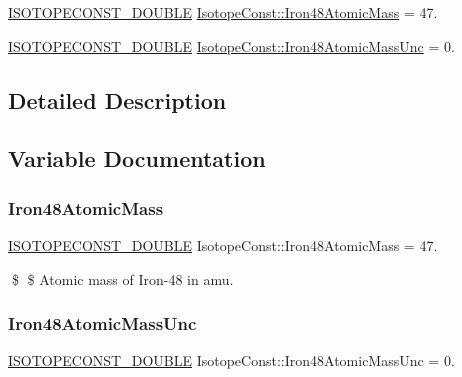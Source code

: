 \begin{DoxyCompactItemize}
\item 
\mbox{\hyperlink{group___isotope_const-_macros_ga8f45a7272ce02c0b4c65c44636ed719a}{I\+S\+O\+T\+O\+P\+E\+C\+O\+N\+S\+T\+\_\+\+D\+O\+U\+B\+LE}} \mbox{\hyperlink{group___isotope_const-_iron-_fe48_ga60de25b8676dde1dcba2161223673a20}{Isotope\+Const\+::\+Iron48\+Atomic\+Mass}} = 47.
\item 
\mbox{\hyperlink{group___isotope_const-_macros_ga8f45a7272ce02c0b4c65c44636ed719a}{I\+S\+O\+T\+O\+P\+E\+C\+O\+N\+S\+T\+\_\+\+D\+O\+U\+B\+LE}} \mbox{\hyperlink{group___isotope_const-_iron-_fe48_gae31c5e7a0863ca71b5bcd4b12bde69f9}{Isotope\+Const\+::\+Iron48\+Atomic\+Mass\+Unc}} = 0.
\end{DoxyCompactItemize}


\subsection{Detailed Description}


\subsection{Variable Documentation}
\mbox{\label{group___isotope_const-_iron-_fe48_ga60de25b8676dde1dcba2161223673a20}} 
\subsubsection{\texorpdfstring{Iron48\+Atomic\+Mass}{Iron48AtomicMass}}
{\footnotesize\ttfamily \mbox{\hyperlink{group___isotope_const-_macros_ga8f45a7272ce02c0b4c65c44636ed719a}{I\+S\+O\+T\+O\+P\+E\+C\+O\+N\+S\+T\+\_\+\+D\+O\+U\+B\+LE}} Isotope\+Const\+::\+Iron48\+Atomic\+Mass = 47.}

\$ \$ Atomic mass of Iron-\/48 in amu. \mbox{\label{group___isotope_const-_iron-_fe48_gae31c5e7a0863ca71b5bcd4b12bde69f9}} 
\subsubsection{\texorpdfstring{Iron48\+Atomic\+Mass\+Unc}{Iron48AtomicMassUnc}}
{\footnotesize\ttfamily \mbox{\hyperlink{group___isotope_const-_macros_ga8f45a7272ce02c0b4c65c44636ed719a}{I\+S\+O\+T\+O\+P\+E\+C\+O\+N\+S\+T\+\_\+\+D\+O\+U\+B\+LE}} Isotope\+Const\+::\+Iron48\+Atomic\+Mass\+Unc = 0.}

